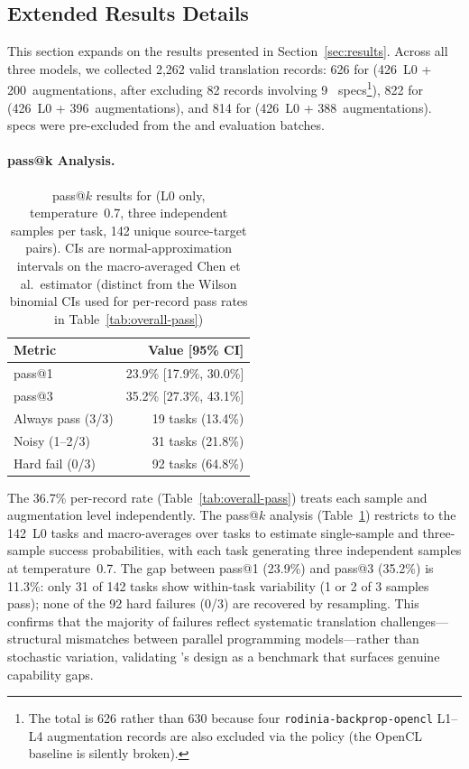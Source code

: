 \subsection{Extended Results Details}
\label{sec:appendix-e4}

This section expands on the results presented in Section~\ref{sec:results}.
Across all three models, we collected 2,262 valid translation records: 626 for \qwenshort{} (426~L0 + 200~augmentations, after excluding 82 records involving 9~\knownfail{} specs\footnote{The \qwenshort{} total is 626 rather than 630 because four \texttt{rodinia-backprop-opencl} L1--L4 augmentation records are also excluded via the \knownfail{} policy (the OpenCL baseline is silently broken).}), 822 for \gptnew{} (426~L0 + 396~augmentations), and 814 for \codex{} (426~L0 + 388~augmentations). \knownfail{} specs were pre-excluded from the \gptnew{} and \codex{} evaluation batches.

\paragraph{pass@k Analysis.}
\begin{table}[!htbp]
\centering
\caption{pass@$k$ results for \qwenshort{} (L0 only, temperature~0.7, three independent samples per task, 142 unique source-target pairs). CIs are normal-approximation intervals on the macro-averaged Chen et al.\ estimator (distinct from the Wilson binomial CIs used for per-record pass rates in Table~\ref{tab:overall-pass})}
\label{tab:pass-at-k-main}
\small
\begin{tabular}{@{}lr@{}}
\toprule
Metric & Value [95\% CI] \\
\midrule
pass@1 & 23.9\% [17.9\%, 30.0\%] \\
pass@3 & 35.2\% [27.3\%, 43.1\%] \\
\midrule
Always pass (3/3) & 19 tasks (13.4\%) \\
Noisy (1--2/3) & 31 tasks (21.8\%) \\
Hard fail (0/3) & 92 tasks (64.8\%) \\
\bottomrule
\end{tabular}
\end{table}
The 36.7\% per-record rate (Table~\ref{tab:overall-pass}) treats each sample and augmentation level independently. The pass@$k$ analysis (Table~\ref{tab:pass-at-k-main}) restricts to the 142~L0 tasks and macro-averages over tasks to estimate single-sample and three-sample success probabilities, with each task generating three independent samples at temperature~0.7. The gap between pass@1 (23.9\%) and pass@3 (35.2\%) is 11.3\%: only 31 of 142 tasks show within-task variability (1 or 2 of 3 samples pass); none of the 92 hard failures (0/3) are recovered by resampling. This confirms that the majority of failures reflect systematic translation challenges---structural mismatches between parallel programming models---rather than stochastic variation, validating \parbench{}'s design as a benchmark that surfaces genuine capability gaps.

